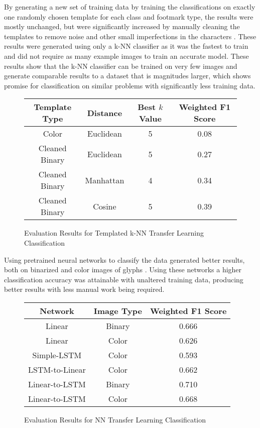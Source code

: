 By generating a new set of training data by training the classifications on exactly one randomly chosen template for each class and footmark type, the results were mostly unchanged, but were significantly increased by manually cleaning the templates to remove noise and other small imperfections in the characters . These results were generated using only a k-NN classifier as it was the fastest to train and did not require as many example images to train an accurate model. These results show that the k-NN classifier can be trained on very few images and generate comparable results to a dataset that is magnitudes larger, which shows promise for classification on similar problems with significantly less training data.

\begin{figure}[H]
    \caption{Evaluation Results for Templated k-NN Transfer Learning Classification}
    \label{fig:classificationKNNTemplates}
    \centering
    \begin{tabular}{ | c | c | c | c | }
        \hline
        Template Type & Distance & Best $k$ Value & Weighted F1 Score \\
        \hline
        Color & Euclidean & 5 & 0.08 \\
        Cleaned Binary & Euclidean & 5 & 0.27 \\
        Cleaned Binary & Manhattan & 4 & 0.34 \\
        Cleaned Binary & Cosine & 5 & 0.39 \\
        \hline
    \end{tabular}
\end{figure}

Using pretrained neural networks to classify the data generated better results, both on binarized and color images of glyphs . Using these networks a higher classification accuracy was attainable with unaltered training data, producing better results with less manual work being required.

\begin{figure}[H]
    \caption{Evaluation Results for NN Transfer Learning Classification}
    \label{fig:classificationFeatureVectorNN}
    \centering
    \begin{tabular}{ | c | c | c | }
        \hline
        Network & Image Type & Weighted F1 Score \\
        \hline
        Linear & Binary & 0.666 \\
        Linear & Color & 0.626 \\
        Simple-LSTM & Color & 0.593 \\
        LSTM-to-Linear & Color & 0.662 \\
        Linear-to-LSTM & Binary & 0.710 \\
        Linear-to-LSTM & Color & 0.668 \\
        \hline
    \end{tabular}
\end{figure}


